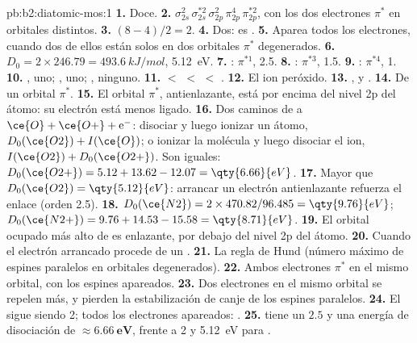\begin{solution}{pb:b2:diatomic-mos:1}
\textbf{1.} Doce.
\textbf{2.} $\sigma_{2s}^2\,\sigma_{2s}^{*2}\,\sigma_{2p}^2\,\pi_{2p}^4\,\pi_{2p}^{*2}$, con los dos electrones
$\pi^*$ en orbitales distintos.
\textbf{3.} $(8 - 4)/2 = 2$.
\textbf{4.} Dos:  es .
\textbf{5.} Aparea todos los electrones, cuando dos de ellos están solos en dos orbitales
$\pi^*$ degenerados.
\textbf{6.} $D_0 = 2 \times 246.79 = \qty{493.6}{kJ/mol}$, \qty{5.12}{eV}.
\textbf{7.} : $\pi^{*1}$,  2.5.
\textbf{8.} : $\pi^{*3}$,  1.5.
\textbf{9.} : $\pi^{*4}$,  1.
\textbf{10.} , uno; , uno; , ninguno.
\textbf{11.}  $<$  $<$  $<$ .
\textbf{12.} El ion peróxido.
\textbf{13.} ,  y .
\textbf{14.} De un orbital $\pi^*$.
\textbf{15.} El orbital $\pi^*$, antienlazante, está por encima del nivel 2p del átomo: su
electrón está menos ligado.
\textbf{16.} Dos caminos de  a $\ce{O} + \ce{O+} + \mathrm e^-$: disociar y luego
ionizar un átomo, $D_0(\ce{O2}) + I(\ce{O})$; o ionizar la molécula y luego disociar el ion,
$I(\ce{O2}) + D_0(\ce{O2+})$. Son iguales: $D_0(\ce{O2+}) = 5.12 + 13.62 - 12.07 = \qty{6.66}{eV}$.
\textbf{17.} Mayor que $D_0(\ce{O2}) = \qty{5.12}{eV}$: arrancar un electrón antienlazante
refuerza el enlace (orden 2.5).
\textbf{18.} $D_0(\ce{N2}) = 2 \times 470.82/96.485 = \qty{9.76}{eV}$; $D_0(\ce{N2+}) = 9.76 +
14.53 - 15.58 = \qty{8.71}{eV}$.
\textbf{19.} El orbital ocupado más alto de  es enlazante, por debajo del nivel 2p del
átomo.
\textbf{20.} Cuando el electrón arrancado procede de un .
\textbf{21.} La regla de Hund (número máximo de espines paralelos en orbitales degenerados).
\textbf{22.} Ambos electrones $\pi^*$ en el mismo orbital, con los espines apareados.
\textbf{23.} Dos electrones en el mismo orbital se repelen más, y pierden la
estabilización de canje de los espines paralelos.
\textbf{24.} El  sigue siendo 2; todos los electrones apareados: .
\textbf{25.}  tiene un  $\boldsymbol{2.5}$ y una energía de disociación de
$\boldsymbol{\approx \qty{6.66}{eV}}$, frente a 2 y \qty{5.12}{eV} para .
\end{solution}
